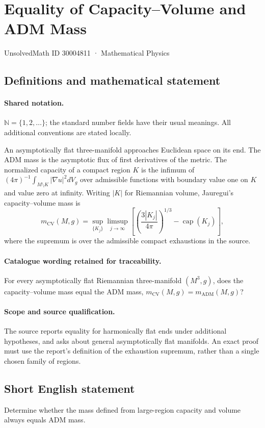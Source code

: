 \documentclass[11pt]{article}
\begin{document}
\setcounter{section}{30004810}
\section{Equality of Capacity–Volume and ADM Mass}\label{30004811}
{\small UnsolvedMath ID 30004811 · Mathematical Physics}
\subsection{Definitions and mathematical statement}

\paragraph{Shared notation.}$\mathbb N=\{1,2,\ldots\}$; the standard number fields have their usual meanings. All additional conventions are stated locally.


An asymptotically flat three-manifold approaches Euclidean space on its end. The ADM mass is the asymptotic flux of first derivatives of the metric. The normalized capacity of a compact region $K$ is the infimum of $(4\pi)^{-1}\int_{M\setminus K}|\nabla u|^2dV_g$ over admissible functions with boundary value one on $K$ and value zero at infinity. Writing $|K|$ for Riemannian volume, Jauregui's capacity--volume mass is
\[
m_{\mathrm{CV}}(M,g)=\sup_{\{K_j\}}\limsup_{j\to\infty}
\left[\left(\frac{3|K_j|}{4\pi}\right)^{1/3}-\operatorname{cap}(K_j)\right],
\]
where the supremum is over the admissible compact exhaustions in the source.

\paragraph{Catalogue wording retained for traceability.}
For every asymptotically flat Riemannian three-manifold $(M^3,g)$, does the capacity–volume mass equal the ADM mass, $m_{\mathrm{CV}}(M,g)=m_{\mathrm{ADM}}(M,g)$?

\paragraph{Scope and source qualification.}The source reports equality for harmonically flat ends under additional hypotheses, and asks about general asymptotically flat manifolds. An exact proof must use the report's definition of the exhaustion supremum, rather than a single chosen family of regions.
\subsection{Short English statement}
Determine whether the mass defined from large-region capacity and volume always equals ADM mass.
\end{document}
